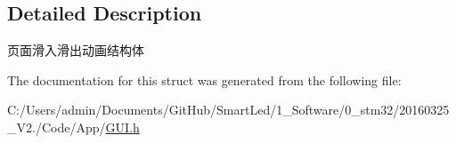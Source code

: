 \subsection{\-Detailed \-Description}
页面滑入滑出动画结构体 

\-The documentation for this struct was generated from the following file\-:\begin{DoxyCompactItemize}
\item 
\-C\-:/\-Users/admin/\-Documents/\-Git\-Hub/\-Smart\-Led/1\-\_\-\-Software/0\-\_\-stm32/20160325\-\_\-\-V2./\-Code/\-App/\hyperlink{_g_u_i_8h}{\-G\-U\-I.\-h}\end{DoxyCompactItemize}
